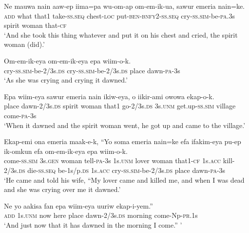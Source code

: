 \ea\label{ex:a:x12}
\gll  Ne  mauwa  nain  aaw-ep  iima=pa  wu-om-ap                 om-em-ik-ua,  sawur  emeria  nain=ke. \\
\textsc{add}  what  that1  take-\textsc{ss.seq}  chest-\textsc{loc}  put-\textsc{ben}-\textsc{bnfy}2-\textsc{ss.seq}   cry-\textsc{ss}.\textsc{sim}-be-\textsc{pa}.3s  spirit  woman  that-\textsc{cf} \\


\glt ‘And she took this thing whatever and put it on his chest and cried, the spirit woman (did).’ \\
\z


\ea\label{ex:a:x13}
\gll  Om-em-ik-eya  om-em-ik-eya  epa  wiim-o-k. \\
cry-\textsc{ss}.\textsc{sim}-be-2/3s.\textsc{ds}  cry-\textsc{ss}.\textsc{sim}-be-2/3s.\textsc{ds}  place  dawn-\textsc{pa}-3s \\
\glt ‘As she was crying and crying it dawned.’ \\
\z


\ea\label{ex:a:x14}
\gll  Epa  wiim-eya  sawur  emeria  nain  ikiw-eya,  o  iikir-ami             owowa  ekap-o-k. \\
place  dawn-2/3s.\textsc{ds}  spirit  woman  that1  go-2/3s.\textsc{ds}  3s.\textsc{unm}  get.up-\textsc{ss}.\textsc{sim}  village  come-\textsc{pa}-3s \\


\glt ‘When it dawned and the spirit woman went, he got up and came to the village.’ \\
\z


\ea\label{ex:a:x15}
\gll  Ekap-emi  ona  emeria  maak-e-k,  “Yo  soma  emeria  nain=ke  efa          ifakim-eya  pu-ep  ik-omkun  efa  om-em-ik-eya                       epa  wiim-o-k. \\
come-\textsc{ss}.\textsc{sim}  3s.\textsc{gen}  woman  tell-\textsc{pa}-3s  1s.\textsc{unm}  lover  woman  that1-\textsc{cf}  1s.\textsc{acc}   kill-2/3s.\textsc{ds}  die-\textsc{ss.seq}  be-1s/p.\textsc{ds}  1s.\textsc{acc}  cry-\textsc{ss}.\textsc{sim}-be-2/3s.\textsc{ds}  place  dawn-\textsc{pa}-3s \\




\glt ‘He came and told his wife, “My lover came and killed me, and when I was dead and she was crying over me it dawned.’ \\
\z


\ea\label{ex:a:x16}
\gll  Ne  yo  aakisa  fan  epa  wiim-eya  uuriw  ekap-i-yem.” \\
\textsc{add}  1s.\textsc{unm}  now  here  place  dawn-2/3s.\textsc{ds}  morning  come-Np-\textsc{pr}.1s \\
\glt ‘And just now that it has dawned in the morning I come.” ’ \\
\z


